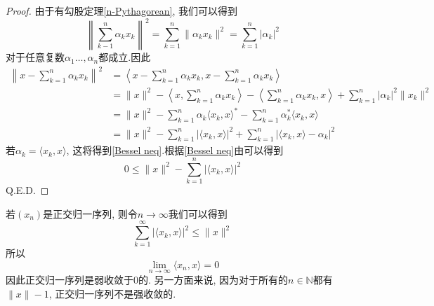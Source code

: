 \documentclass[a4paper,11pt]{article}
\newtheorem{proof}{证明}[section]
\begin{document}
\begin{proof}
  由于有勾股定理\eqref{n-Pythagorean}, 我们可以得到
  \begin{equation*}
    \left\|\sum_{k-1}^{n}\alpha_k x_k\right\|^2=\sum_{k=1}^{n}\|\alpha_k x_k\|^2=\sum_{k=1}^{n}|\alpha_k|^2
  \end{equation*}
  对于任意复数$\alpha_1\dots,\alpha_n$都成立.因此
  \begin{equation*}
  \begin{split}
     \left\|x-\sum_{k=1}^{n}\alpha_k x_k\right\|^2&=\left\langle x-\sum_{k=1}^{n}\alpha_kx_k,x-\sum_{k=1}^{n}\alpha_kx_k\right\rangle \\
       &=\|x\|^2-\left\langle x,\sum_{k=1}^{n}\alpha_kx_k\right\rangle-\left\langle\sum_{k=1}^{n}\alpha_kx_k,x\right\rangle+\sum_{k=1}^{n}|\alpha_k|^2\|x_k\|^2 \\
       &=\|x\|^2-\sum_{k=1}^{n}\alpha_k\langle x_k,x\rangle^*-\sum_{k=1}^{n}\alpha_k^*\langle x_k,x\rangle \\
       &=\|x\|^2-\sum_{k=1}^{n}|\langle x_k,x\rangle|^2+\sum_{k=1}^{n}|\langle x_k,x\rangle-\alpha_k|^2
  \end{split}
  \end{equation*}
  若$\alpha_k=\langle x_k,x\rangle$, 这将得到\eqref{Bessel neq}.根据\eqref{Bessel neq}由可以得到
  \begin{equation*}
    0\leq\|x\|^2-\sum_{k=1}^{n}|\langle x_k,x\rangle|^2
  \end{equation*}
  Q.E.D.
\end{proof}
若$(x_n)$是正交归一序列, 则令$n\to \infty$我们可以得到
\begin{equation}\label{Bessel neq infty}
  \sum_{k=1}^{\infty}|\langle x_k,x\rangle|^2\leq\|x\|^2
\end{equation}
所以
\begin{equation*}
  \lim_{n\to\infty}\langle x_n,x\rangle=0
\end{equation*}
因此正交归一序列是弱收敛于$0$的. 另一方面来说, 因为对于所有的$n\in \mathbb{N}$都有$\|x\|-1$, 正交归一序列不是强收敛的.
\end{document}
